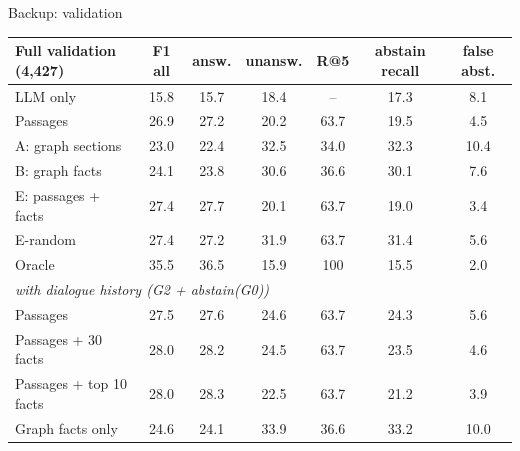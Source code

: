 \documentclass[aspectratio=169,11pt]{beamer}
\begin{document}
\begin{frame}[label=backval]{Backup: validation}
\centering
\footnotesize
\begin{tabular}{lcccccc}
\toprule
Full validation (4,427) & F1 all & answ. & unansw. & R@5 & abstain recall & false abst. \\
\midrule
LLM only & 15.8 & 15.7 & 18.4 & -- & 17.3 & 8.1 \\ %
Passages & 26.9 & 27.2 & 20.2 & 63.7 & 19.5 & 4.5 \\ %
A: graph sections & 23.0 & 22.4 & 32.5 & 34.0 & 32.3 & 10.4 \\ %
B: graph facts & 24.1 & 23.8 & 30.6 & 36.6 & 30.1 & 7.6 \\ %
E: passages + facts & 27.4 & 27.7 & 20.1 & 63.7 & 19.0 & 3.4 \\ %
E-random & 27.4 & 27.2 & 31.9 & 63.7 & 31.4 & 5.6 \\ %
Oracle & 35.5 & 36.5 & 15.9 & 100 & 15.5 & 2.0 \\ %
\midrule
\multicolumn{7}{l}{\emph{with dialogue history (G2 + abstain(G0))}} \\
Passages & 27.5 & 27.6 & 24.6 & 63.7 & 24.3 & 5.6 \\ %
Passages + 30 facts & 28.0 & 28.2 & 24.5 & 63.7 & 23.5 & 4.6 \\ %
Passages + top 10 facts & 28.0 & 28.3 & 22.5 & 63.7 & 21.2 & 3.9 \\ %
Graph facts only & 24.6 & 24.1 & 33.9 & 36.6 & 33.2 & 10.0 \\ %
\bottomrule
\end{tabular}
\end{frame}
\end{document}
